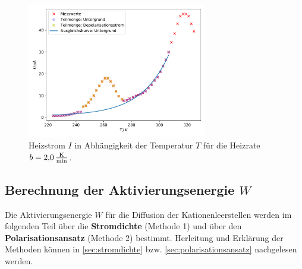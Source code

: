 \begin{figure}
    \centering
    \includegraphics[width=0.7\textwidth]{content/data/T_I_kurve_20.pdf}
    \caption{Heizstrom $I$ in Abhängigkeit der Temperatur $T$ für die Heizrate $b = \SI{2.0}{\frac{\kelvin}{\minute}}$. \cite{numpy}\cite{matplotlib}\cite{scipy}}
    \label{fig:strom_temp_20}
\end{figure}
\FloatBarrier
\subsection{Berechnung der Aktivierungsenergie $W$}
Die Aktivierungsenergie $W$ für die Diffusion der Kationenleerstellen werden im folgenden Teil über die \textbf{Stromdichte} (Methode 1) und über den \textbf{Polarisationsansatz} (Methode 2) bestimmt.
Herleitung und Erklärung der Methoden können in \autoref{sec:stromdichte} bzw. \autoref{sec:polarisationsansatz} nachgelesen werden.

